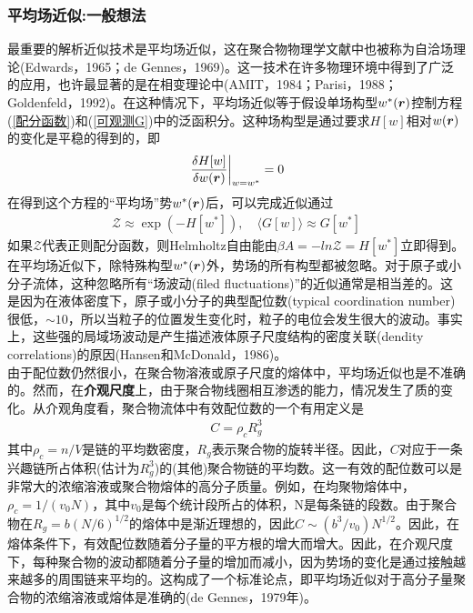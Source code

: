 \subsubsection{平均场近似:一般想法}
最重要的解析近似技术是平均场近似，这在聚合物物理学文献中也被称为自洽场理论(Edwards，1965；de Gennes，1969)。这一技术在许多物理环境中得到了广泛的应用，也许最显著的是在相变理论中(AMIT，1984；Parisi，1988；Goldenfeld，1992)。在这种情况下，平均场近似等于假设单场构型$w^*(\bm{r})$控制方程(\ref{配分函数})和(\ref{可观测G})中的泛函积分。这种场构型是通过要求$H[w]$相对$w(\bm{r})$的变化是平稳的得到的，即\\
\begin{gather}
	\left. \frac{\delta H[w]}{\delta w(\bm{r})}\right|_{w=w^*} =0 \label{H[w]相对w(r)的变化}
\end{gather}
在得到这个方程的“平均场”势$w^*(\bm{r})$后，可以完成近似通过\\
\begin{gather}
	\mathcal{Z} \approx \exp(-H[w^*]),\quad \langle G[w]\rangle \approx G[w^*]
\end{gather}
如果$\mathcal{Z}$代表正则配分函数，则Helmholtz自由能由$\beta A = −ln\mathcal{Z} = H[w^*]$立即得到。\\

在平均场近似下，除特殊构型$w^*(\bm{r})$外，势场的所有构型都被忽略。对于原子或小分子流体，这种忽略所有“场波动(filed fluctuations)”的近似通常是相当差的。这是因为在液体密度下，原子或小分子的典型配位数(typical coordination number)很低，$\sim 10$，所以当粒子的位置发生变化时，粒子的电位会发生很大的波动。事实上，这些强的局域场波动是产生描述液体原子尺度结构的密度关联(dendity correlations)的原因(Hansen和McDonald，1986)。\\

由于配位数仍然很小，在聚合物溶液或原子尺度的熔体中，平均场近似也是不准确的。然而，在\textbf{介观尺度}上，由于聚合物线圈相互渗透的能力，情况发生了质的变化。从介观角度看，聚合物流体中有效配位数的一个有用定义是\\
\begin{gather}
	C=\rho_c R_g^3
\end{gather}
其中$\rho_c=n/V$是链的平均数密度，$R_g$表示聚合物的旋转半径。因此，$C$对应于一条兴趣链所占体积(估计为$R_g^3$)的(其他)聚合物链的平均数。这一有效的配位数可以是非常大的浓缩溶液或聚合物熔体的高分子质量。例如，在均聚物熔体中，$\rho_c=1/(v_0N)$，其中$v_0$是每个统计段所占的体积，N是每条链的段数。由于聚合物在$R_g=b(N/6)^{1/2}$的熔体中是渐近理想的，因此$C\sim (b^3/v_0)N^{1/2}$。因此，在熔体条件下，有效配位数随着分子量的平方根的增大而增大。因此，在介观尺度下，每种聚合物的波动都随着分子量的增加而减小，因为势场的变化是通过接触越来越多的周围链来平均的。这构成了一个标准论点，即平均场近似对于高分子量聚合物的浓缩溶液或熔体是准确的(de Gennes，1979年)。\\



